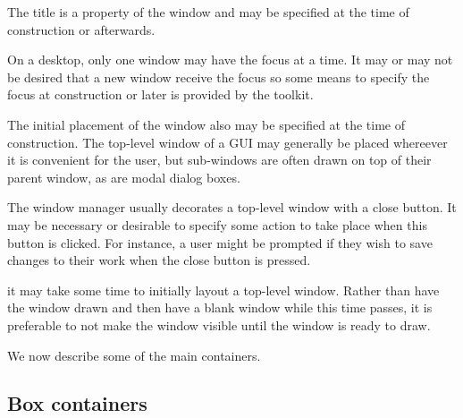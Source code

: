 


The title is a property of the window and may be specified at the time
of construction or afterwards. 

On a desktop, only one window may have the focus at a time. It may or
may not be desired that a new window receive the focus so some means
to specify the focus at construction or later is provided by the
toolkit.

The initial placement of the window also may be specified at the time
of construction. The top-level window of a GUI may generally be placed
whereever it is convenient for the user, but sub-windows are often
drawn on top of their parent window, as are modal dialog boxes. 




The window manager usually decorates a top-level window with a close
button. It may be necessary or desirable to specify some action to
take place when this button is clicked. For instance, a user might be
prompted if they wish to save changes to their work when the close
button is pressed.

it may take some time to initially layout a top-level window. Rather
than have the window drawn and then have a blank window while this
time passes, it is preferable to not make the window visible until the
window is ready to draw. 


We now describe some of the main containers.


\subsection{Box containers}
\label{sec:GUI:Box-containers}

